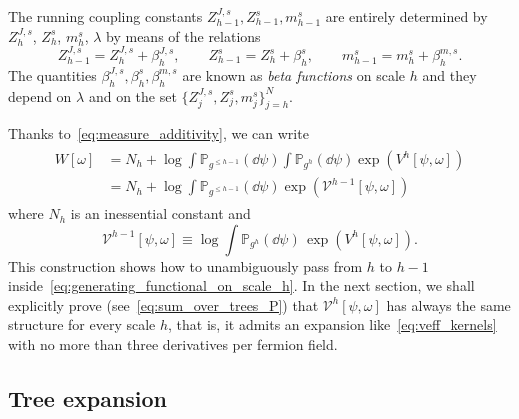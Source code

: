\documentclass[a4paper, 11pt]{article}
\newcommand{\dgauss}[2]{\mathbb{P}_{#1}(\dd #2)}			%
\newcommand{\sing}[2]{{#1}^{#2}}							%
\newcommand{\src}{\omega}									%
\theoremstyle{thm}
\begin{document}
The running coupling constants $Z^{J, s}_{h-1}, Z^s_{h-1}, m^s_{h-1}$ are entirely determined by $Z^{J, s}_h$, $Z^s_h$, $m^s_h$, $\lambda$ by means of the relations
\begin{equation}
Z^{J, s}_{h-1} = Z^{J, s}_h + \beta^{J, s}_h, \qquad Z^s_{h-1} = Z^s_h + \beta^s_h, \qquad m^s_{h-1} = m^s_h + \beta^{m, s}_h.
\end{equation}
The quantities $\beta^{J, s}_h, \beta^s_h, \beta^{m, s}_h$ are known as \emph{beta functions} on scale $h$ and they depend on $\lambda$ and on the set $\lbrace Z^{J, s}_j, Z^s_j, m^s_j \rbrace_{j = h}^N$.

Thanks to~\eqref{eq:measure_additivity}, we can write
\begin{align}
\label{eq:generating_functional_additivity}
\begin{split}
W[\src] 
& = N_h + \log \int \dgauss{\sing{g}{\le h-1}}{\psi}\int \dgauss{\sing{g}{h}}{\psi}
\exp (\sing{V}{h}[\psi, \src]) \\
& = N_h + \log \int \dgauss{\sing{g}{\le h-1}}{\psi} \exp(\sing{\mathscr{V}}{h-1}[\psi, \src])
\end{split}
\end{align}
where $N_h$ is an inessential constant and 
\begin{equation}
\label{eq:V_h_integration_definition}
\sing{\mathscr{V}}{h-1}[\psi, \src] \equiv \log \int \dgauss{\sing{g}{h}}{\psi} \, \exp ( \sing{V}{h}[\psi, \src] ).
\end{equation}
This construction shows how to unambiguously pass from $h$ to $h-1$ inside~\eqref{eq:generating_functional_on_scale_h}. In the next section, we shall explicitly prove (see~\eqref{eq:sum_over_trees_P}) that $\sing{\mathscr{V}}{h}[\psi, \src]$ has always the same structure for every scale $h$, that is, it admits an expansion like~\eqref{eq:veff_kernels} with no more than three derivatives per fermion field.

\subsection{Tree expansion}
\label{subsec:trees}
\end{document}
